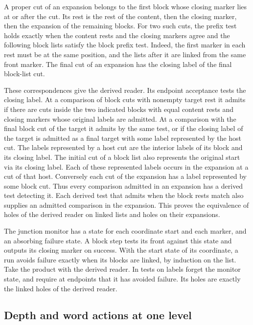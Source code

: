 A proper cut of an expansion belongs to the first block whose closing
marker lies at or after the cut. Its rest is the rest of the content,
then the closing marker, then the expansion of the remaining blocks.
For two such cuts, the prefix test holds exactly when the content
rests and the closing markers agree and the following block lists
satisfy the block prefix test. Indeed, the first marker in each rest
must be at the same position, and the lists after it are linked from
the same front marker. The final cut of an expansion has the closing
label of the final block-list cut.

These correspondences give the derived reader. Its endpoint acceptance
tests the closing label. At a comparison of block cuts with nonempty
target rest it admits if there are cuts inside the two indicated
blocks with equal content rests and closing markers whose original
labels are admitted. At a comparison with the final block cut of the
target it admits by the same test, or if the closing label of the
target is admitted as a final target with some label represented
by the host cut. The labels represented by a host cut are the interior
labels of its block and its closing label. The initial cut of a
block list also represents the original start via its closing label.
Each of these represented labels occurs in the expansion at a cut
of that host. Conversely each cut of the expansion has a label
represented by some block cut. Thus every comparison admitted in an
expansion has a derived test detecting it. Each derived test that
admits when the block rests match also supplies an admitted
comparison in the expansion. This proves the equivalence of holes
of the derived reader on linked lists and holes on their expansions.

The junction monitor has a state for each coordinate start and each
marker, and an absorbing failure state. A block step tests its front
against this state and outputs its closing marker on success. With
the start state of its coordinate, a run avoids failure exactly
when its blocks are linked, by induction on the list. Take the product
with the derived reader. In tests on labels forget the monitor state,
and require at endpoints that it has avoided failure. Its holes are
exactly the linked holes of the derived reader.

\subsection{Depth and word actions at one level}

